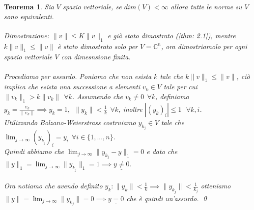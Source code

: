 \documentclass[a4paper,12pt]{report}
\newtheorem{teorema}{Teorema}[chapter]
\newcommand{\lt}{<}
\newcommand{\gt}{>}
\begin{document}
\begin{teorema}\label{app: .4}
    Sia $V$ spazio vettoriale, se $dim(V)\lt \infty$ allora tutte le norme su $V$ sono equivalenti.
    \\
    \\ \underline{Dimostrazione}: $\boxed{\|v\|\leq K \|v\|_1}$ e già stato dimostrato (\ref{thm: 2.1}), mentre $\boxed{k\|v\|_1\leq\|v\|}$ è stato dimostrato solo per $V=\mathbb{C}^n$, ora dimostriamolo per ogni spazio vettoriale $V$ con dimesnsione finita.
    \\
    \\Procediamo per assurdo. Poniamo che non esista $k$ tale che $k\|v\|_1 \leq\|v\|$, ciò implica che esista una successione a elementi $v_k\in V$ tale per cui $\|v_k\|_1\gt k \|v_k\| \ \ \forall k$. Assumendo che $v_k \neq0 \ \ \forall k$, definiamo $y_k=\displaystyle\frac{v_k}{\|v_k\|} \implies y_k=1,\ \ \|y_k\|\lt \frac{1}{k} \ \ \forall k$, inoltre $|(y_k)_i| \leq 1 \  \ \ \forall k, i $.
    \\ Utilizzando Bolzano-Weierstrass costruiamo $y_{k_j} \in V$ tale che $\displaystyle\lim_{j\to \infty}(y_{k_j})_i =y_i \ \ \forall i \in \{1,...,n\}$.
    \\Quindi abbiamo che $\displaystyle\lim_{j \to \infty}\|y_{k_j}-y\|_1=0$ e dato che $\|y\|_1=\displaystyle\lim_{j \to \infty}\|y_{k_j}\|_1=1 \implies \underline{y\neq 0}$.
    \\
    \\ Ora notiamo che avendo definito $y_k:\|y_k\| \lt\displaystyle\frac{1}{k}\implies \|y_{k_j}\|\lt \frac{1}{k_j}$ otteniamo 
    \\$ \|y\|=\lim_{j \to \infty}\|y_{k_j}\| =0 \implies \underline{y=0}$ che è quindi un'assurdo. \qed
\end{teorema}



\newpage
\end{document}
